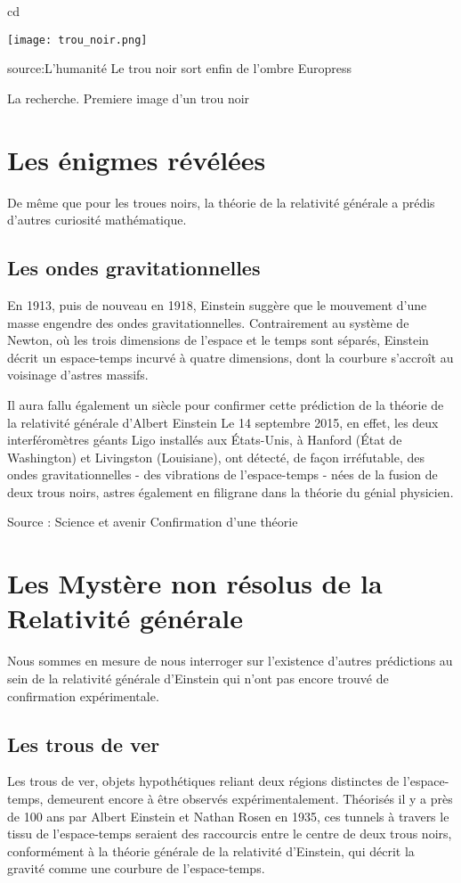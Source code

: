cd\documentclass{article}
\begin{document}
\texttt{[image: trou\_noir.png]}

source:L'humanité Le trou noir sort enfin de l'ombre
Europress

La recherche. Premiere image d'un trou noir



\label{sec:article3} 

\section{Les énigmes révélées} 
De même que pour les troues noirs, la théorie de la relativité générale a prédis d'autres curiosité mathématique. 
\subsection{Les ondes gravitationnelles}
En 1913, puis de nouveau en 1918, Einstein suggère que le mouvement d'une masse engendre des ondes gravitationnelles. Contrairement au système de Newton, où les trois dimensions de l'espace et le temps sont séparés, Einstein décrit un espace-temps incurvé à quatre dimensions, dont la courbure s'accroît au voisinage d'astres massifs.

Il aura fallu également un siècle pour confirmer cette prédiction de la théorie de la relativité générale d'Albert Einstein  Le 14 septembre 2015, en effet, les deux interféromètres géants Ligo installés aux États-Unis, à Hanford (État de Washington) et Livingston (Louisiane), ont détecté, de façon irréfutable, des ondes gravitationnelles - des vibrations de l'espace-temps - nées de la fusion de deux trous noirs, astres également en filigrane dans la théorie du génial physicien.

Source : Science et avenir Confirmation d'une théorie


\section{Les Mystère non résolus de la Relativité générale} %

Nous sommes en mesure de nous interroger sur l'existence d'autres prédictions au sein de la relativité générale d'Einstein qui n'ont pas encore trouvé de confirmation expérimentale.
\subsection{Les trous de ver}
Les trous de ver, objets hypothétiques reliant deux régions distinctes de l'espace-temps, demeurent encore à être observés expérimentalement. Théorisés il y a près de 100 ans par Albert Einstein et Nathan Rosen en 1935, ces tunnels à travers le tissu de l'espace-temps seraient des raccourcis entre le centre de deux trous noirs, conformément à la théorie générale de la relativité d'Einstein, qui décrit la gravité comme une courbure de l'espace-temps. 
\end{document}
